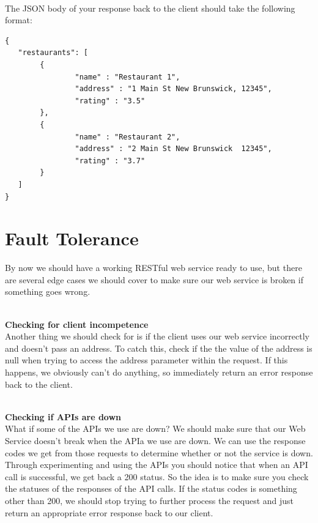 \documentclass{article}
\begin{document}
\-\ \\
The JSON body of your response back to the client should take the following format:

\begin{verbatim}
{ 
   "restaurants": [
        { 
                "name" : "Restaurant 1",  
                "address" : "1 Main St New Brunswick, 12345", 
                "rating" : "3.5" 
        },
        { 
                "name" : "Restaurant 2", 
                "address" : "2 Main St New Brunswick  12345", 
                "rating" : "3.7" 
        }
   ]
}
\end{verbatim}



\section{Fault Tolerance}

By now we should have a working RESTful web service ready to use, but there are several edge cases we should cover to make sure our web service is broken if something goes wrong.

\-\ \\
\textbf{Checking for client incompetence} \\
Another thing we should check for is if the client uses our web service incorrectly and doesn't pass an address. To catch this, check if the the value of the address is null when trying to access the address parameter within the request. If this happens, we obviously can't do anything, so immediately return an error response back to the client. 

\-\ \\
\textbf{Checking if APIs are down}\\
What if some of the APIs we use are down? We should make sure that our Web Service doesn't break when the APIa we use are down. We can use the response codes we get from those requests to determine whether or not the service is down. Through experimenting and using the APIs you should notice that when an API call is successful, we get back a 200 status. So the idea is to make sure you check the statuses of the responses of the API calls. If the status codes is something other than 200, we should stop trying to further process the request and just return an appropriate error response back to our client. 
\end{document}
